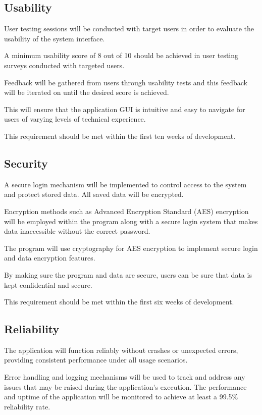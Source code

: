     \subsection{Usability}
    User testing sessions will be conducted with target users in order to evaluate the usability of the system interface.

    A minimum usability score of 8 out of 10 should be achieved in user testing surveys conducted with targeted users.

    Feedback will be gathered from users through usability tests and this feedback will be iterated on until the desired score is achieved.

    This will ensure that the application GUI is intuitive and easy to navigate for users of varying levels of technical experience.

    This requirement should be met within the first ten weeks of development.

    \subsection{Security}
    A secure login mechanism will be implemented to control access to the system and protect stored data. All saved data will be encrypted.

    Encryption methods such as Advanced Encryption Standard (AES) encryption will be employed within the program along with a secure login system that makes data inaccessible without the correct password.

    The program will use cryptography for AES encryption to implement secure login and data encryption features.

    By making sure the program and data are secure, users can be sure that data is kept confidential and secure.

    This requirement should be met within the first six weeks of development.

    \subsection{Reliability}
    The application will function reliably without crashes or unexpected errors, providing consistent performance under all usage scenarios.

    Error handling and logging mechanisms will be used to track and address any issues that may be raised during the application's execution. The performance and uptime of the application will be monitored to achieve at least a 99.5\% reliability rate.

